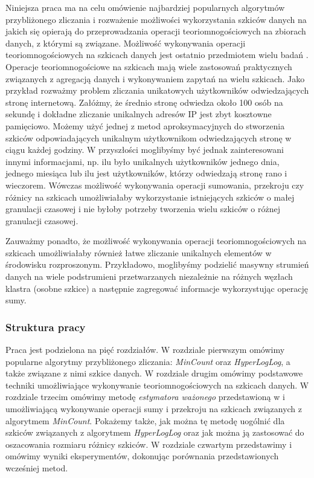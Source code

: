 Niniejsza praca ma na celu omówienie najbardziej popularnych algorytmów przybliżonego zliczania i rozważenie możliwości wykorzystania szkiców danych
na jakich się opierają do przeprowadzania operacji teoriomnogościowych na zbiorach danych, z którymi są związane.  Możliwość wykonywania operacji teoriomnogościowych na szkicach danych jest ostatnio przedmiotem wielu badań \cite{ting} \cite{oertl} \cite{adroll}.
Operacje teoriomnogościowe na szkicach mają wiele zastosowań praktycznych związanych z agregacją danych i  wykonywaniem  zapytań na wielu szkicach. Jako przykład rozważmy problem zliczania unikatowych użytkowników odwiedzających stronę internetową. Załóżmy, że średnio stronę odwiedza około 100 osób na sekundę i dokładne zliczanie unikalnych adresów IP jest zbyt kosztowne pamięciowo. Możemy użyć jednej z metod aproksymacyjnych do stworzenia szkiców odpowiadających unikalnym użytkownikom odwiedzających stronę  w ciągu każdej godziny. W przyszłości moglibyśmy być jednak zainteresowani innymi informacjami, np. ilu było
unikalnych użytkowników jednego dnia, jednego miesiąca
lub ilu jest użytkowników, którzy odwiedzają stronę rano i wieczorem.   
Wówczas możliwość wykonywania operacji sumowania, przekroju czy różnicy na szkicach umożliwiałaby wykorzystanie istniejących szkiców o małej granulacji czasowej i nie byłoby potrzeby tworzenia wielu szkiców o różnej granulacji czasowej. 

Zauważmy ponadto, że możliwość wykonywania operacji 
teoriomnogościowych na szkicach umożliwiałaby również
łatwe zliczanie unikalnych elementów w środowisku rozproszonym. Przykładowo, moglibyśmy podzielić masywny strumień danych na wiele podstrumieni przetwarzanych niezależnie na różnych węzłach klastra (osobne szkice)
a następnie zagregować informacje wykorzystując operację sumy.

\subsubsection{Struktura pracy}
Praca jest podzielona na pięć rozdziałów. W rozdziale pierwszym omówimy popularne algorytmy przybliżonego zliczania: \textit{MinCount} oraz \textit{HyperLogLog}, a także związane z nimi szkice danych. 
W rozdziale drugim omówimy podstawowe techniki 
umożliwiające wykonywanie  teoriomnogościowych na szkicach danych. W rozdziale trzecim omówimy metodę \textit{estymatora ważonego} przedstawioną w \cite{ting} i umożliwiającą wykonywanie operacji sumy i przekroju na szkicach związanych z algorytmem \textit{MinCount}. Pokażemy także, jak można tę metodę uogólnić dla szkiców związanych z algorytmem \textit{HyperLogLog} oraz jak można ją zastosować do oszacowania rozmiaru różnicy szkiców. W rozdziale czwartym przedstawimy i omówimy wyniki eksperymentów, dokonując porównania przedstawionych wcześniej metod.